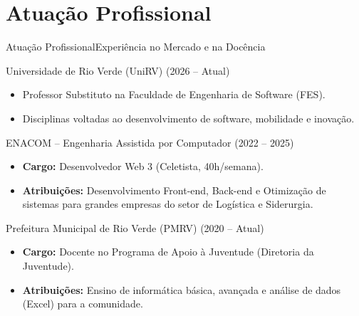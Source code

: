 \documentclass[9pt]{beamer}
\begin{document}
\section{Atuação Profissional}
\begin{frame}{Atuação Profissional}{Experiência no Mercado e na Docência}
  \begin{block}{Universidade de Rio Verde (UniRV) \hfill \small (2026 -- Atual)}
    \begin{itemize}
      \item Professor Substituto na Faculdade de Engenharia de Software (FES).
      \item Disciplinas voltadas ao desenvolvimento de software, mobilidade e inovação.
    \end{itemize}
  \end{block}

  \begin{block}{ENACOM -- Engenharia Assistida por Computador \hfill \small (2022 -- 2025)}
    \begin{itemize}
      \item \textbf{Cargo:} Desenvolvedor Web 3 (Celetista, 40h/semana).
      \item \textbf{Atribuições:} Desenvolvimento Front-end, Back-end e Otimização de sistemas para grandes empresas do setor de Logística e Siderurgia.
    \end{itemize}
  \end{block}

  \begin{block}{Prefeitura Municipal de Rio Verde (PMRV) \hfill \small (2020 -- Atual)}
    \begin{itemize}
      \item \textbf{Cargo:} Docente no Programa de Apoio à Juventude (Diretoria da Juventude).
      \item \textbf{Atribuições:} Ensino de informática básica, avançada e análise de dados (Excel) para a comunidade.
    \end{itemize}
  \end{block}
\end{frame}

\end{document}
